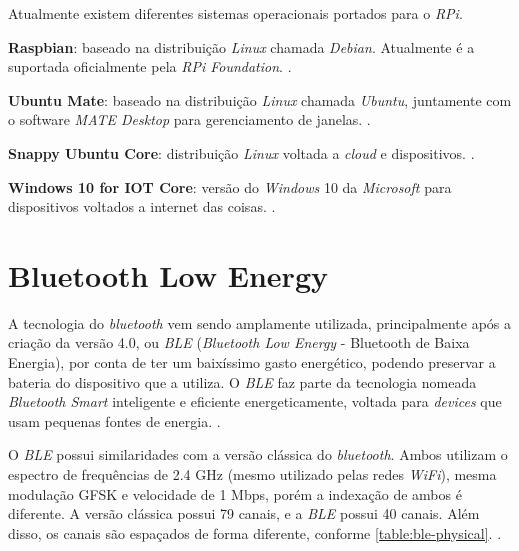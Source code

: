 Atualmente existem diferentes sistemas operacionais portados para o \textit{RPi}.

\begin{alineas}
	\item \textbf{Raspbian}: baseado na distribuição \textit{Linux} chamada \textit{Debian}. Atualmente é a suportada oficialmente pela \textit{RPi Foundation}. \cite{rpi-download}.
	\item \textbf{Ubuntu Mate}: baseado na distribuição \textit{Linux} chamada \textit{Ubuntu}, juntamente com o software \textit{MATE Desktop} para gerenciamento de janelas. \cite{ubuntu-mate}.
	\item \textbf{Snappy Ubuntu Core}: distribuição \textit{Linux} voltada a \textit{cloud} e dispositivos. \cite{snappy-ubuntu}.
	\item \textbf{Windows 10 for IOT Core}: versão do \textit{Windows} 10 da \textit{Microsoft} para dispositivos voltados a internet das coisas. \cite{windows10-iot}.
\end{alineas}

\section{Bluetooth Low Energy}\label{sec:ble}

A tecnologia do \textit{bluetooth} vem sendo amplamente utilizada, principalmente após a criação da versão 4.0, ou \textit{BLE} (\textit{Bluetooth Low Energy} - Bluetooth de Baixa Energia), por conta de ter um baixíssimo gasto energético, podendo preservar a bateria do dispositivo que a utiliza. O \textit{BLE} faz parte da tecnologia nomeada \textit{Bluetooth Smart} inteligente e eficiente energeticamente, voltada para \textit{devices} que usam pequenas fontes de energia. \cite{bluetooth-smart}.

O \textit{BLE} possui similaridades com a versão clássica do \textit{bluetooth}. Ambos utilizam o espectro de frequências de 2.4 GHz (mesmo utilizado pelas redes \textit{WiFi}), mesma modulação GFSK e velocidade de 1 Mbps, porém a indexação de ambos é diferente. A versão clássica possui 79 canais, e a \textit{BLE} possui 40 canais. Além disso, os canais são espaçados de forma diferente, conforme \autoref{table:ble-physical}. \cite{ble-packets}.

\begin{table}[htb]
\end{table}

